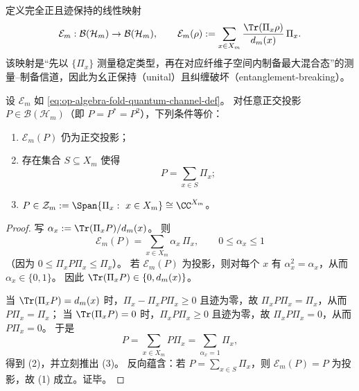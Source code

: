 定义完全正且迹保持的线性映射
\begin{equation}\label{eq:op-algebra-fold-quantum-channel-def}
\mathcal{E}_m:\mathcal{B}(\mathcal{H}_m)\to\mathcal{B}(\mathcal{H}_m),\qquad
\mathcal{E}_m(\rho):=\sum_{x\in X_m}\frac{\Tr(\Pi_x\rho)}{d_m(x)}\,\Pi_x.
\end{equation}
该映射是“先以 \(\{\Pi_x\}\) 测量稳定类型，再在对应纤维子空间内制备最大混合态”的测量--制备信道，因此为幺正保持（unital）且纠缠破坏（entanglement-breaking）。

\begin{proposition}[投影在粗粒化下的 \(0/1\) 刚性]\label{prop:op-algebra-fold-quantum-channel-projection-01-rigidity}
设 \(\mathcal{E}_m\) 如 \eqref{eq:op-algebra-fold-quantum-channel-def}。
对任意正交投影 \(P\in\mathcal{B}(\mathcal{H}_m)\)（即 \(P=P^\ast=P^2\)），下列条件等价：
\begin{enumerate}
  \item \(\mathcal{E}_m(P)\) 仍为正交投影；
  \item 存在集合 \(S\subseteq X_m\) 使得
  \[
  P=\sum_{x\in S}\Pi_x;
  \]
  \item \(P\in\mathcal{Z}_m:=\Span\{\Pi_x:\ x\in X_m\}\cong \CC^{X_m}\)。
\end{enumerate}
\end{proposition}
\begin{proof}
写
\(
\alpha_x:=\Tr(\Pi_xP)/d_m(x)
\)。
则
\[
\mathcal{E}_m(P)=\sum_{x\in X_m}\alpha_x\,\Pi_x,
\qquad
0\le \alpha_x\le 1
\]
（因为 \(0\le \Pi_xP\Pi_x\le \Pi_x\)）。
若 \(\mathcal{E}_m(P)\) 为投影，则对每个 \(x\) 有 \(\alpha_x^2=\alpha_x\)，从而 \(\alpha_x\in\{0,1\}\)。
因此 \(\Tr(\Pi_xP)\in\{0,d_m(x)\}\)。

当 \(\Tr(\Pi_xP)=d_m(x)\) 时，\(\Pi_x-\Pi_xP\Pi_x\ge 0\) 且迹为零，故 \(\Pi_xP\Pi_x=\Pi_x\)，从而 \(P\Pi_x=\Pi_x\)；
当 \(\Tr(\Pi_xP)=0\) 时，\(\Pi_xP\Pi_x\ge 0\) 且迹为零，故 \(\Pi_xP\Pi_x=0\)，从而 \(P\Pi_x=0\)。
于是
\[
P=\sum_{x\in X_m}P\Pi_x=\sum_{\alpha_x=1}\Pi_x,
\]
得到 (2)，并立刻推出 (3)。
反向蕴含：若 \(P=\sum_{x\in S}\Pi_x\)，则 \(\mathcal{E}_m(P)=P\) 为投影，故 (1) 成立。证毕。
\end{proof}

